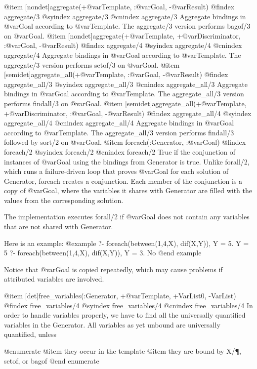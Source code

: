 {{{{{{{{@item [nondet]aggregate(+@var{Template}, :@var{Goal}, -@var{Result})
@findex aggregate/3
@syindex aggregate/3
@cnindex aggregate/3
    Aggregate bindings in @var{Goal} according to @var{Template}. The
    aggregate/3 version performs bagof/3 on @var{Goal}.
@item [nondet]aggregate(+@var{Template}, +@var{Discriminator}, :@var{Goal}, -@var{Result})
@findex aggregate/4
@syindex aggregate/4
@cnindex aggregate/4
    Aggregate bindings in @var{Goal} according to @var{Template}. The
    aggregate/3 version performs setof/3 on @var{Goal}.
@item [semidet]aggregate_all(+@var{Template}, :@var{Goal}, -@var{Result})
@findex aggregate_all/3
@syindex aggregate_all/3
@cnindex aggregate_all/3
    Aggregate bindings in @var{Goal} according to @var{Template}. The
    aggregate_all/3 version performs findall/3 on @var{Goal}.
@item [semidet]aggregate_all(+@var{Template}, +@var{Discriminator}, :@var{Goal}, -@var{Result})
@findex aggregate_all/4
@syindex aggregate_all/4
@cnindex aggregate_all/4
    Aggregate bindings in @var{Goal} according to @var{Template}. The
    aggregate_all/3 version performs findall/3 followed by sort/2 on
    @var{Goal}.
@item foreach(:Generator, :@var{Goal})
@findex foreach/2
@syindex foreach/2
@cnindex foreach/2
    True if the conjunction of instances of @var{Goal} using the
    bindings from Generator is true. Unlike forall/2, which runs a
    failure-driven loop that proves @var{Goal} for each solution of
    Generator, foreach creates a conjunction. Each member of the
    conjunction is a copy of @var{Goal}, where the variables it shares
    with Generator are filled with the values from the corresponding
    solution.

    The implementation executes forall/2 if @var{Goal} does not contain
    any variables that are not shared with Generator.

    Here is an example:
@example
    ?- foreach(between(1,4,X), dif(X,Y)), Y = 5.
    Y = 5
    ?- foreach(between(1,4,X), dif(X,Y)), Y = 3.
    No
@end example

    Notice that @var{Goal} is copied repeatedly, which may cause
    problems if attributed variables are involved.

@item [det]free_variables(:Generator, +@var{Template}, +VarList0, -VarList)
@findex free_variables/4
@syindex free_variables/4
@cnindex free_variables/4
    In order to handle variables properly, we have to find all the universally quantified variables in the Generator. All variables as yet unbound are universally quantified, unless

@enumerate
@item they occur in the template
@item they are bound by X/\P, setof, or bagof
@end enumerate

}}}}}}}}
